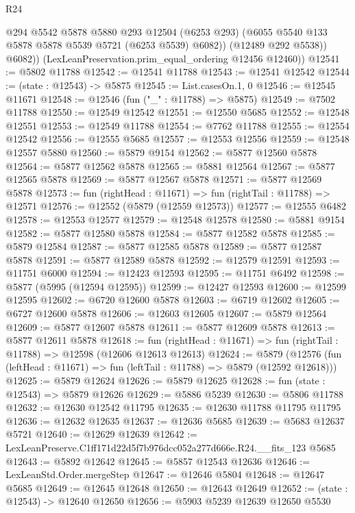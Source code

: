 \begin{lexlean}{R24}
\begin{coremodule}
              @294
              @5542
              @5878
              @5880
              @293
              @12504
              (@6253 @293)
              (@6055 @5540 @133 @5878 @5878 @5539 @5721 (@6253 @5539) @6082))
            (@12489 @292 @5538))
          @6082))
      (LexLeanPreservation.prim_equal_ordering @12456 @12460))
@12541 := @5802 @11788
@12542 := @12541 @11788
@12543 := @12541 @12542
@12544 := (state : @12543) -> @5875
@12545 := List.casesOn.{1, 0}
@12546 := @12545 @11671
@12548 := @12546 (fun ("_" : @11788) => @5875)
@12549 := @7502 @11788
@12550 := @12549 @12542
@12551 := @12550 @5685
@12552 := @12548 @12551
@12553 := @12549 @11788
@12554 := @7762 @11788
@12555 := @12554 @12542
@12556 := @12555 @5685
@12557 := @12553 @12556
@12559 := @12548 @12557 @5880
@12560 := @5879 @9154
@12562 := @5877 @12560 @5878
@12564 := @5877 @12562 @5878
@12565 := @5881 @12564
@12567 := @5877 @12565 @5878
@12569 := @5877 @12567 @5878
@12571 := @5877 @12569 @5878
@12573 := fun (rightHead : @11671) => fun (rightTail : @11788) => @12571
@12576 := @12552 (@5879 (@12559 @12573))
@12577 := @12555 @6482
@12578 := @12553 @12577
@12579 := @12548 @12578
@12580 := @5881 @9154
@12582 := @5877 @12580 @5878
@12584 := @5877 @12582 @5878
@12585 := @5879 @12584
@12587 := @5877 @12585 @5878
@12589 := @5877 @12587 @5878
@12591 := @5877 @12589 @5878
@12592 := @12579 @12591
@12593 := @11751 @6000
@12594 := @12423 @12593
@12595 := @11751 @6492
@12598 := @5877 (@5995 (@12594 @12595))
@12599 := @12427 @12593
@12600 := @12599 @12595
@12602 := @6720 @12600 @5878
@12603 := @6719 @12602
@12605 := @6727 @12600 @5878
@12606 := @12603 @12605
@12607 := @5879 @12564
@12609 := @5877 @12607 @5878
@12611 := @5877 @12609 @5878
@12613 := @5877 @12611 @5878
@12618 := fun (rightHead : @11671) => fun (rightTail : @11788) => @12598 (@12606 @12613 @12613)
@12624 := @5879
    (@12576 (fun (leftHead : @11671) => fun (leftTail : @11788) => @5879 (@12592 @12618)))
@12625 := @5879 @12624
@12626 := @5879 @12625
@12628 := fun (state : @12543) => @5879 @12626
@12629 := @5886 @5239
@12630 := @5806 @11788
@12632 := @12630 @12542 @11795
@12635 := @12630 @11788 @11795 @11795
@12636 := @12632 @12635
@12637 := @12636 @5685
@12639 := @5683 @12637 @5721
@12640 := @12629 @12639
@12642 := LexLeanPreserve.C1ff171d22d5f7b976dcc052a277d666e.R24.__fits_123 @5685
@12643 := @5892 @12642
@12645 := @5857 @12543 @12636
@12646 := LexLeanStd.Order.mergeStep
@12647 := @12646 @5804
@12648 := @12647 @5685
@12649 := @12645 @12648
@12650 := @12643 @12649
@12652 := (state : @12543) -> @12640 @12650
@12656 := @5903 @5239 @12639 @12650 @5530

\end{coremodule}
\end{lexlean}

